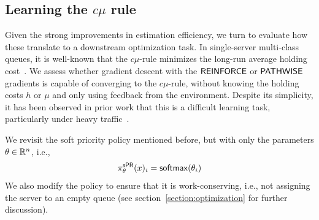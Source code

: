 




\subsection{Learning the $c\mu$ rule}
\label{section:learn_cmu}
Given the strong improvements in estimation efficiency, we turn to evaluate how these translate to a downstream optimization task.
In single-server multi-class queues, it is well-known that the $c\mu$-rule minimizes the long-run average holding cost~\cite{cox1961queues}. We assess whether gradient descent with the $\mathsf{REINFORCE}$ or $\mathsf{PATHWISE}$ gradients is capable of converging to the $c\mu$-rule, without knowing the holding costs $h$ or $\mu$ and only using feedback from the environment. Despite its simplicity, it has been observed in prior work that this is a difficult learning task, particularly under heavy traffic~\cite{tran2022finding}.

We revisit the soft priority policy mentioned before, but with only the parameters $\theta\in \mathbb{R}^{n}$, i.e., 
\begin{equation}
\label{eq:soft_priority}
\pi^{\mathsf{sPR}}_{\theta}(x)_{i}= \mathop{\mathsf{softmax}}(\theta_{i})
\end{equation}
We also modify the policy to ensure that it is work-conserving, i.e., not assigning the server to an empty queue (see section~\ref{section:optimization} for further discussion).

